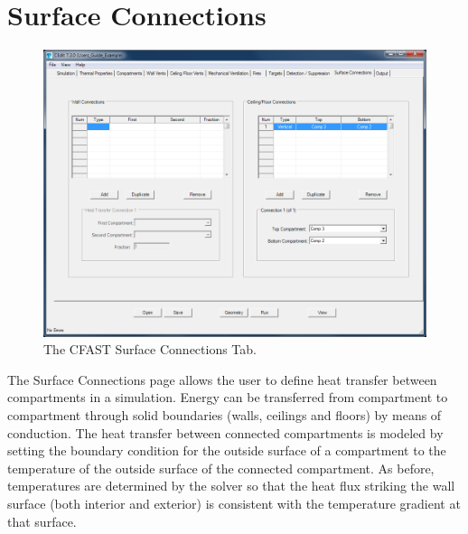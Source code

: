 \chapter{Surface Connections}
\label{info:CONN}
\begin{figure}[h!]
\begin{center}
\includegraphics[width=6.5in]{FIGURES/Surface_Connection_Tab}
\caption[The CFAST Surface Connections Tab]{The CFAST Surface Connections Tab.}
\end{center}
\end{figure}

The Surface Connections page allows the user to define heat transfer between compartments in a simulation. Energy can be transferred from compartment to compartment through solid boundaries (walls, ceilings and floors) by means of conduction. The heat transfer between connected compartments is modeled by setting the boundary condition for the outside surface of a compartment to the temperature of the outside surface of the  connected compartment.   As before, temperatures are determined by the solver so that the heat flux striking the wall surface (both interior and exterior) is consistent with the temperature gradient at that surface.

